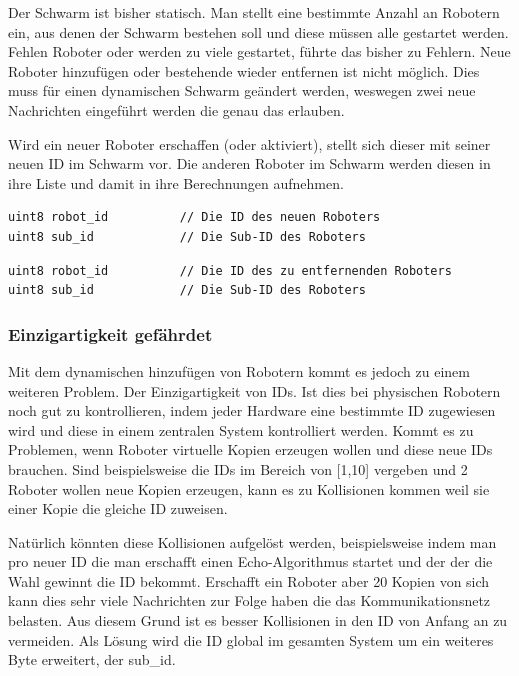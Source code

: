 Der Schwarm ist bisher statisch. Man stellt eine bestimmte Anzahl an Robotern ein, aus denen der Schwarm bestehen soll und diese müssen alle gestartet werden. Fehlen Roboter oder werden zu viele gestartet, führte das bisher zu Fehlern. Neue Roboter hinzufügen oder bestehende wieder entfernen ist nicht möglich. Dies muss für einen dynamischen Schwarm geändert werden, weswegen zwei neue Nachrichten eingeführt werden die genau das erlauben.

Wird ein neuer Roboter erschaffen (oder aktiviert), stellt sich dieser mit seiner neuen ID im Schwarm vor. Die anderen Roboter im Schwarm werden diesen in ihre Liste und damit in ihre Berechnungen aufnehmen.

\begin{lstlisting}[style=ros, title=Nachrichten-Typ: New\_Robot.msg]
uint8 robot_id			// Die ID des neuen Roboters
uint8 sub_id			// Die Sub-ID des Roboters
\end{lstlisting}

\begin{lstlisting}[style=ros, title=Nachrichten-Typ: Delete\_Robot.msg]
uint8 robot_id			// Die ID des zu entfernenden Roboters
uint8 sub_id			// Die Sub-ID des Roboters
\end{lstlisting}

\subsubsection*{Einzigartigkeit gefährdet}

Mit dem dynamischen hinzufügen von Robotern kommt es jedoch zu einem weiteren Problem. Der Einzigartigkeit von IDs. Ist dies bei physischen Robotern noch gut zu kontrollieren, indem jeder Hardware eine bestimmte ID zugewiesen wird und diese in einem zentralen System kontrolliert werden. Kommt es zu Problemen, wenn Roboter virtuelle Kopien erzeugen wollen und diese neue IDs brauchen. Sind beispielsweise die IDs im Bereich von [1,10] vergeben und 2 Roboter wollen neue Kopien erzeugen, kann es zu Kollisionen kommen weil sie einer Kopie die gleiche ID zuweisen.

Natürlich könnten diese Kollisionen aufgelöst werden, beispielsweise indem man pro neuer ID die man erschafft einen Echo-Algorithmus startet und der der die Wahl gewinnt die ID bekommt. Erschafft ein Roboter aber 20 Kopien von sich kann dies sehr viele Nachrichten zur Folge haben die das Kommunikationsnetz belasten. Aus diesem Grund ist es besser Kollisionen in den ID von Anfang an zu vermeiden. Als Lösung wird die ID global im gesamten System um ein weiteres Byte erweitert, der sub\_id.

